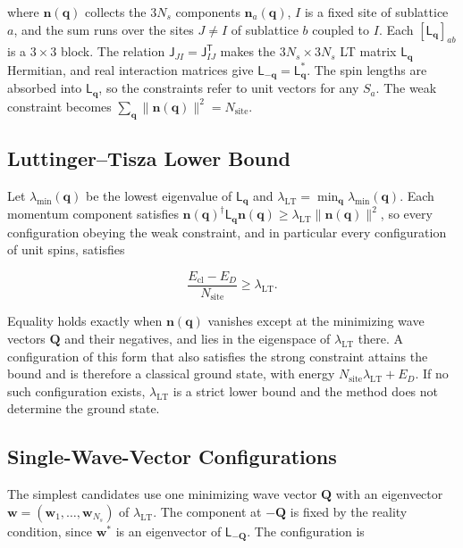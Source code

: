 where \(\mathbf n(\mathbf q)\) collects the \(3N_s\) components \(\mathbf n_a(\mathbf q)\), \(I\) is a fixed site of sublattice \(a\), and the sum runs over the sites \(J\neq I\) of sublattice \(b\) coupled to \(I\). Each \([\mathsf L_{\mathbf q}]_{ab}\) is a \(3\times3\) block. The relation \(\mathsf J_{JI}=\mathsf J_{IJ}^{\mathsf T}\) makes the \(3N_s\times3N_s\) LT matrix \(\mathsf L_{\mathbf q}\) Hermitian, and real interaction matrices give \(\mathsf L_{-\mathbf q}=\mathsf L_{\mathbf q}^*\). The spin lengths are absorbed into \(\mathsf L_{\mathbf q}\), so the constraints refer to unit vectors for any \(S_a\). The weak constraint becomes \(\sum_{\mathbf q}\|\mathbf n(\mathbf q)\|^2=N_{\mathrm{site}}\).

\subsection{Luttinger--Tisza Lower Bound}

Let \(\lambda_{\min}(\mathbf q)\) be the lowest eigenvalue of \(\mathsf L_{\mathbf q}\) and \(\lambda_{\mathrm{LT}}=\min_{\mathbf q}\lambda_{\min}(\mathbf q)\). Each momentum component satisfies \(\mathbf n(\mathbf q)^\dagger\mathsf L_{\mathbf q}\mathbf n(\mathbf q)\ge\lambda_{\mathrm{LT}}\|\mathbf n(\mathbf q)\|^2\), so every configuration obeying the weak constraint, and in particular every configuration of unit spins, satisfies

\begin{equation}\label{eq-lswt-lt-bound}
\frac{E_{\mathrm{cl}}-E_D}{N_{\mathrm{site}}}\ge\lambda_{\mathrm{LT}}.
\end{equation}

Equality holds exactly when \(\mathbf n(\mathbf q)\) vanishes except at the minimizing wave vectors \(\mathbf Q\) and their negatives, and lies in the eigenspace of \(\lambda_{\mathrm{LT}}\) there. A configuration of this form that also satisfies the strong constraint attains the bound and is therefore a classical ground state, with energy \(N_{\mathrm{site}}\lambda_{\mathrm{LT}}+E_D\). If no such configuration exists, \(\lambda_{\mathrm{LT}}\) is a strict lower bound and the method does not determine the ground state.

\subsection{Single-Wave-Vector Configurations}

The simplest candidates use one minimizing wave vector \(\mathbf Q\) with an eigenvector \(\mathbf w=(\mathbf w_1,\ldots,\mathbf w_{N_s})\) of \(\lambda_{\mathrm{LT}}\). The component at \(-\mathbf Q\) is fixed by the reality condition, since \(\mathbf w^*\) is an eigenvector of \(\mathsf L_{-\mathbf Q}\). The configuration is

